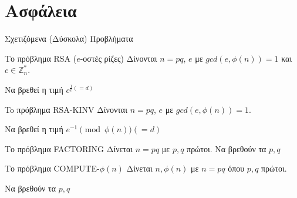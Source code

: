 \documentclass[handout]{beamer}
\begin{document}
\section{Ασφάλεια}
\begin{frame}{Σχετιζόμενα (Δύσκολα) Προβλήματα}
\begin{block}{Το πρόβλημα RSA ($e$-οστές ρίζες)}
Δίνονται  $n=pq$, $e$ με $gcd(e,\phi(n))=1$ και $c \in \mathbb{Z}_{n}^*$.

Να βρεθεί η τιμή $c^{\frac{1}{e}(=d)}$
\end{block}
\pause
\begin{block}{To πρόβλημα RSA-KINV}
Δίνονται  $n=pq$, $e$ με $gcd(e,\phi(n))=1$.

Να βρεθεί η τιμή $ e^{-1} \pmod {\phi(n)} (=d)$
\end{block}
\pause
\begin{block}{Το πρόβλημα FACTORING}
Δίνεται $n=pq$ με $p,q$ πρώτοι. Να βρεθούν τα $p,q$
\end{block}
\pause
\begin{block}{Το πρόβλημα COMPUTE-$\phi(n)$}
Δίνεται $n, \phi(n)$ με $n = pq$ όπου $p,q$ πρώτοι.

Να βρεθούν τα $p,q$
\end{block}
\end{frame}
\end{document}
